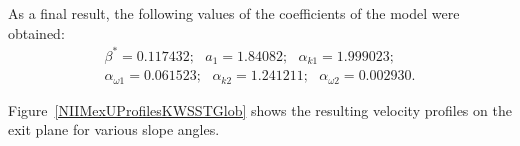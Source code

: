 \documentclass[sensors,article,submit,moreauthors,pdftex]{Definitions/mdpi}
\begin{document}
As a final result, the following values of the coefficients of the model were obtained:
\begin{equation}
	\begin{aligned}
		\beta^* = 0.117432;\ \ \ a_1 = 1.84082;\ \ \ \alpha_{k 1} = 1.999023;\\
		\alpha_{\omega 1} = 0.061523; \ \ \ \alpha_{k 2} = 1.241211;\ \ \ \alpha_{\omega 2} = 0.002930.
	\end{aligned}
\end{equation}

Figure~\ref{NIIMexUProfilesKWSSTGlob} shows the resulting velocity profiles on the exit plane for various slope angles.
\end{document}
